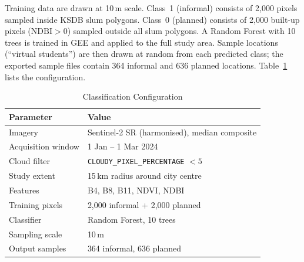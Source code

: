 \documentclass[conference]{IEEEtran}
\newcommand{\km}{\,km}
\newcommand{\m}{\,m}
\begin{document}
Training data are drawn at 10\m{} scale. Class~1 (informal) consists of 2,000 pixels sampled inside KSDB slum polygons. Class~0 (planned) consists of 2,000 built-up pixels ($\mathrm{NDBI}>0$) sampled outside all slum polygons. A Random Forest \cite{breiman2001} with 10 trees is trained in GEE and applied to the full study area. Sample locations (``virtual students'') are then drawn at random from each predicted class; the exported sample files contain 364 informal and 636 planned locations. Table~\ref{tab:rf} lists the configuration.

\begin{table}[!t]
\centering
\caption{Classification Configuration}
\label{tab:rf}
\footnotesize
\begin{tabular}{@{}ll@{}}
\toprule
\textbf{Parameter} & \textbf{Value} \\
\midrule
Imagery & Sentinel-2 SR (harmonised), median composite \\
Acquisition window & 1 Jan -- 1 Mar 2024 \\
Cloud filter & \texttt{CLOUDY\_PIXEL\_PERCENTAGE} $<5$ \\
Study extent & 15\km{} radius around city centre \\
Features & B4, B8, B11, NDVI, NDBI \\
Training pixels & 2,000 informal + 2,000 planned \\
Classifier & Random Forest, 10 trees \\
Sampling scale & 10\m{} \\
Output samples & 364 informal, 636 planned \\
\bottomrule
\end{tabular}
\end{table}
\end{document}
